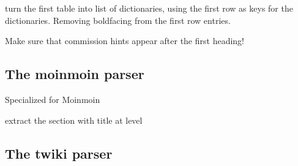 \documentclass[a4paper,10pt,english]{sphinxmanual}
\begin{document}
\begin{fulllineitems}
\begin{fulllineitems}
\end{fulllineitems}


\begin{fulllineitems}
\label{sourcecodedoc:wikiParser.wikiParser.getTable}
turn the first table into list of dictionaries, using the first row as
keys for the dictionaries. Removing boldfacing from the first row entries.

\end{fulllineitems}


\begin{fulllineitems}
\label{sourcecodedoc:wikiParser.wikiParser.moveCommissionHints}
Make sure that commission hints appear after the first heading!

\end{fulllineitems}


\end{fulllineitems}



\subsection{The moinmoin parser}
\label{sourcecodedoc:the-moinmoin-parser}

\begin{fulllineitems}
\label{sourcecodedoc:wikiParser.wikiParserMoinmoin}
Specialized for Moinmoin

\begin{fulllineitems}
\label{sourcecodedoc:wikiParser.wikiParserMoinmoin.getSection}
extract the section with title at level

\end{fulllineitems}


\end{fulllineitems}



\subsection{The twiki parser}
\label{sourcecodedoc:the-twiki-parser}
\end{document}
